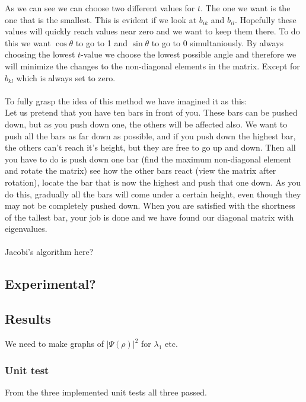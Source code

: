 \documentclass{article}
\newcommand{\husk}[1]{\color{red} #1 \color{black}}
\begin{document}
As we can see we can choose two different values for $t$. The one we want is the one that is the smallest. This is evident if we look at $b_{ik}$ and $b_{il}$. Hopefully these values will quickly reach values near zero and  we want to keep them there. To do this we want $\cos \theta$ to go to 1 and $\sin \theta$ to go to 0 simultaniously. By always choosing the lowest $t$-value we choose the lowest possible angle and therefore we will minimize the changes to the non-diagonal elements in the matrix. Except for $b_{kl}$ which is always set to zero. \\ \\

To fully grasp the idea of this method we have imagined it as this: \\
Let us pretend that you have ten bars in front of you. These bars can be pushed down, but as you push down one, the others will be affected also. We want to push all the bars as far down as possible, and if you push down the highest bar, the others can't reach it's height, but they are free to go up and down. Then all you have to do is push down one bar (find the maximum non-diagonal element and rotate the matrix) see how the other bars react (view the matrix after rotation), locate the bar that is now the highest and push that one down. As you do this, gradually all the bars will come under a certain height, even though they may not be completely pushed down. When you are satisfied with the shortness of the tallest bar, your job is done and we have found our diagonal matrix with eigenvalues. \\ \\
\husk{Jacobi's algorithm here?}
\subsection{Experimental?}
\subsection{Results}
\husk{We need to make graphs of $|\Psi(\rho)|^2$ for $\lambda_1$ etc.}
\subsubsection{Unit test}
From the three implemented unit tests all three passed.
\end{document}
